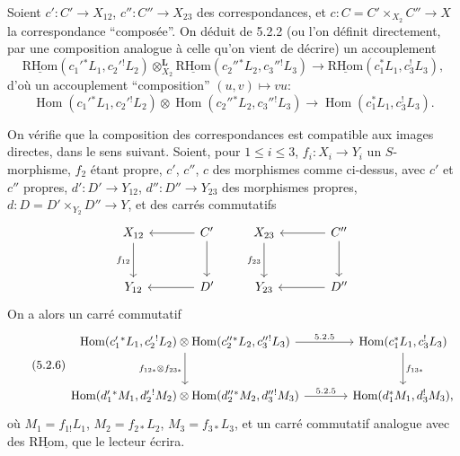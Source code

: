 \documentclass[11pt]{article}
\DeclareMathOperator{\Hom}{Hom}
\providecommand{\RHom}{\mathrm{RHom}}
\providecommand{\uRHom}{\underline{\RHom}}
\providecommand{\RHom}{\mathrm{RHom}}
\providecommand{\Hom}{\operatorname{Hom}}
\providecommand{\RHom}{\mathrm R\mathcal{H}om}
\providecommand{\RHom}{\mathrm{RHom}}
\providecommand{\Hom}{\operatorname{Hom}}
\begin{document}
Soient $c':C'\to X_{12}$, $c'':C''\to X_{23}$ des correspondances, et $c:C=C'\times_{X_2}C''\to X$ la correspondance ``composée''. On déduit de 5.2.2 (ou l'on définit directement, par une composition analogue à celle qu'on vient de décrire) un accouplement
\begin{equation}
\tag{5.2.4}
\uRHom(c_1'{}^*L_1,c_2'{}^!L_2)\otimes_{X_2}^{\mathbf L}\uRHom(c_2''{}^*L_2,c_3''{}^!L_3)
\longrightarrow\uRHom(c_1^*L_1,c_3^!L_3),
\end{equation}
d'où un accouplement ``composition'' $(u,v)\mapsto vu$:
\begin{equation}
\tag{5.2.5}
\Hom(c_1'{}^*L_1,c_2'{}^!L_2)\otimes\Hom(c_2''{}^*L_2,c_3''{}^!L_3)
\longrightarrow\Hom(c_1^*L_1,c_3^!L_3).
\end{equation}

On vérifie que la composition des correspondances est compatible aux images directes, dans le sens suivant. Soient, pour $1\leq i\leq 3$, $f_i:X_i\to Y_i$ un $S$-morphisme, $f_2$ étant propre, $c'$, $c''$, $c$ des morphismes comme ci-dessus, avec $c'$ et $c''$ propres, $d':D'\to Y_{12}$, $d'':D''\to Y_{23}$ des morphismes propres, $d:D=D'\times_{Y_2}D''\to Y$, et des carrés commutatifs
\[
\begin{tikzcd}[column sep=large,row sep=large]
X_{12} \arrow[d,"f_{12}"'] & C' \arrow[l] \arrow[d] \\
Y_{12} & D' \arrow[l]
\end{tikzcd}
\qquad
\begin{tikzcd}[column sep=large,row sep=large]
X_{23} \arrow[d,"f_{23}"'] & C'' \arrow[l] \arrow[d] \\
Y_{23} & D'' \arrow[l]
\end{tikzcd}
\]
On a alors un carré commutatif
\begin{equation}
\tag{5.2.6}
\begin{tikzcd}[column sep=large,row sep=large]
\Hom(c_1'{}^*L_1,c_2'{}^!L_2)\otimes\Hom(c_2''{}^*L_2,c_3''{}^!L_3) \arrow[r,"5.2.5"] \arrow[d,"f_{12*}\otimes f_{23*}"']
& \Hom(c_1^*L_1,c_3^!L_3) \arrow[d,"f_{13*}"] \\
\Hom(d_1'{}^*M_1,d_2'{}^!M_2)\otimes\Hom(d_2''{}^*M_2,d_3''{}^!M_3) \arrow[r,"5.2.5"]
& \Hom(d_1^*M_1,d_3^!M_3),
\end{tikzcd}
\end{equation}
où $M_1=f_{1!}L_1$, $M_2=f_{2*}L_2$, $M_3=f_{3*}L_3$, et un carré commutatif analogue avec des $\uRHom$, que le lecteur écrira.
\end{document}
